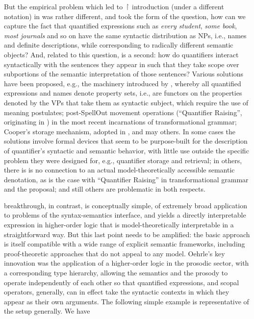 \documentclass[output=paper,colorlinks,citecolor=brown]{langscibook}
\begin{document}
But the empirical problem which led to \ensuremath{\vs} introduction (under a different
notation) in \citet{oehrle1994} was rather different, and took the form of
the question, how can we capture the fact that quantified expressions
such as \textit{every student}, \textit{some book}, \textit{most journals} and so on have
the same syntactic distribution as NPs, i.e., names and definite
descriptions, while corresponding to radically different semantic
objects? And, related to this question, is a second: how do
quantifiers interact syntactically with the sentences they appear in
such that they take scope over subportions of the semantic
interpretation of those sentences? Various solutions have been
proposed, e.g., the machinery introduced by \citet{montague1973a}, whereby all quantified expressions and
names denote property sets, i.e., are functors on the properties
denoted by the VPs that take them as syntactic subject, which require
the use of meaning postulates; post-SpellOut
movement operations (``Quantifier Raising'', originating in
\citet{may_r1985a}) in the most recent incarnations of transformational
grammar; Cooper's \citeyearpar{cooper75,Cooper83}
storage mechanism, adopted in \citet{pollardsag94}, and may others. In
some cases the solutions involve formal devices that seem to be
purpose-built for the description of quantifier's syntactic and
semantic behavior, with little use outside the specific problem they
were designed for, e.g., quantifier storage and retrieval; in others,
there is is no connection to an actual model-theoretically accessible
semantic denotation, as is the case with ``Quantifier Raising'' in
transformational grammar and the \citet{pollardsag94} proposal; and still
others are problematic in both respects.

 breakthrough, in contrast, is conceptually simple, of
extremely broad application to problems of the syntax-semantics
interface, and yields a directly interpretable expression in
higher-order logic that is model-theoretically interpretable in a
straightforward way. But this last point needs to be amplified: the
basic approach is itself compatible with a wide range of explicit
semantic frameworks, including proof-theoretic approaches that do not
appeal to any model. Oehrle's key innovation was the application of a
higher-order logic in the prosodic sector, with a corresponding type
hierarchy, allowing the semantics and the prosody to operate
independently of each other so that quantified expressions, and scopal
operators, generally, can in effect take the syntactic contexts in
which they appear as their own arguments. The following simple example
is representative of the setup generally. We have
\end{document}
